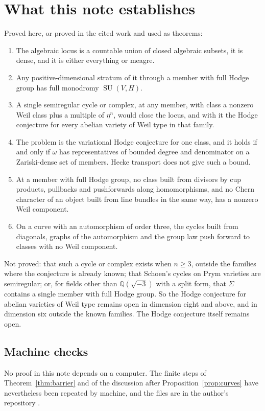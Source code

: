 \documentclass[11pt]{amsart}
\theoremstyle{definition}
\theoremstyle{remark}
\newcommand{\QQ}{\mathbb{Q}}
\newcommand{\SU}{\operatorname{SU}}
\begin{document}
\section{What this note establishes}

Proved here, or proved in the cited work and used as theorems:
\begin{enumerate}[label=(\arabic*)]
\item The algebraic locus is a countable union of closed algebraic
subsets, it is dense, and it is either everything or meagre.
\item Any positive-dimensional stratum of it through a member with full
Hodge group has full monodromy $\SU(V,H)$.
\item A single semiregular cycle or complex, at any member, with class a
nonzero Weil class plus a multiple of $\eta^{n}$, would close the locus,
and with it the Hodge conjecture for every abelian variety of Weil type in
that family.
\item The problem is the variational Hodge conjecture for one class, and it
holds if and only if $\omega$ has representatives of bounded degree and
denominator on a Zariski-dense set of members. Hecke transport does not
give such a bound.
\item At a member with full Hodge group, no class built from divisors by
cup products, pullbacks and pushforwards along homomorphisms, and no Chern
character of an object built from line bundles in the same way, has a
nonzero Weil component.
\item On a curve with an automorphism of order three, the cycles built
from diagonals, graphs of the automorphism and the group law push forward
to classes with no Weil component.
\end{enumerate}
Not proved: that such a cycle or complex exists when $n\ge3$, outside the
families where the conjecture is already known; that Schoen's cycles on
Prym varieties are semiregular; or, for fields other than
$\QQ(\sqrt{-3})$ with a split form, that $\Sigma$ contains a single
member with full Hodge group. So the Hodge conjecture for abelian varieties
of Weil type remains open in dimension eight and above, and in dimension
six outside the known families. The Hodge conjecture itself remains open.

\subsection*{Machine checks}
No proof in this note depends on a computer. The finite steps of
Theorem~\ref{thm:barrier} and of the discussion after
Proposition~\ref{prop:curves} have nevertheless been repeated by machine,
and the files are in the author's repository \cite{BhHC}.
\end{document}
